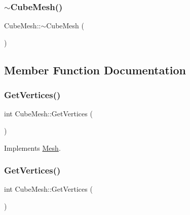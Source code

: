 \mbox{\label{class_cube_mesh_ab785a66ca3587acc32ff3c710dfeff47}} 
\subsubsection{\texorpdfstring{$\sim$CubeMesh()}{~CubeMesh()}\hspace{0.1cm}{\footnotesize\ttfamily [2/2]}}
{\footnotesize\ttfamily Cube\+Mesh\+::$\sim$\+Cube\+Mesh (\begin{DoxyParamCaption}{ }\end{DoxyParamCaption})}



\subsection{Member Function Documentation}
\mbox{\label{class_cube_mesh_af86c2c0b5d36a8579904cad368ae381a}} 
\subsubsection{\texorpdfstring{GetVertices()}{GetVertices()}\hspace{0.1cm}{\footnotesize\ttfamily [1/2]}}
{\footnotesize\ttfamily int Cube\+Mesh\+::\+Get\+Vertices (\begin{DoxyParamCaption}{ }\end{DoxyParamCaption})\hspace{0.3cm}{\ttfamily [virtual]}}



Implements \mbox{\hyperlink{class_mesh_ad8480168123d9a70563b00cdbe7e73ed}{Mesh}}.

\mbox{\label{class_cube_mesh_af86c2c0b5d36a8579904cad368ae381a}} 
\subsubsection{\texorpdfstring{GetVertices()}{GetVertices()}\hspace{0.1cm}{\footnotesize\ttfamily [2/2]}}
{\footnotesize\ttfamily int Cube\+Mesh\+::\+Get\+Vertices (\begin{DoxyParamCaption}{ }\end{DoxyParamCaption})\hspace{0.3cm}{\ttfamily [virtual]}}



